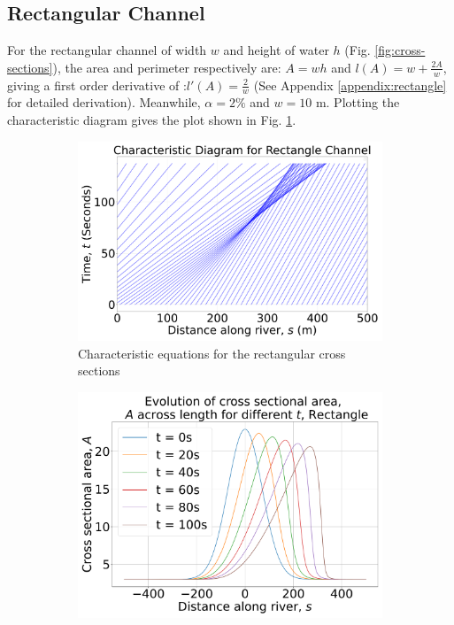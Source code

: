 \documentclass[12pt]{article}
\begin{document}
\subsection{Rectangular Channel}
For the rectangular channel of width $w$ and height of water $h$ (Fig. \ref{fig:cross-sections}), the area and perimeter respectively are: $A = wh$ and $l(A) = w + \frac{2A}{w}$, giving a first order derivative of :$l'(A) = \frac{2}{w}$ (See Appendix \ref{appendix:rectangle} for detailed derivation). Meanwhile, $\alpha = 2\%$ and $w = 10\text{ m}$. Plotting the characteristic diagram gives the plot shown in Fig. \ref{fig:rect_char}.
\begin{figure}[H]
    \centering
    \begin{subfigure}[b]{0.49\textwidth}
        \centering
            \includegraphics[width=\textwidth]{Figures/Rectangle_characteristic.pdf}
        \caption{Characteristic equations for the rectangular cross sections}
        \label{fig:rect_char}
    \end{subfigure}
    \hfill
    \begin{subfigure}[b]{0.49\textwidth}
        \centering
        \includegraphics[width=\textwidth]{Figures/Rectangle_godunov.pdf}

\end{subfigure}
\end{figure}
\end{document}
